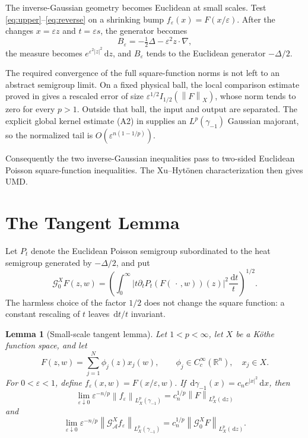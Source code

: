 \documentclass[11pt]{article}
\newtheorem{lemma}{Lemma}
\newcommand{\R}{\mathbb R}
\newcommand{\A}{\mathcal A}
\newcommand{\G}{\mathcal G}
\newcommand{\norm}[1]{\left\lVert #1\right\rVert}
\newcommand{\eps}{\varepsilon}
\newcommand{\dd}{\,\mathrm d}
\begin{document}
The inverse-Gaussian geometry becomes Euclidean at small scales. Test
\eqref{eq:upper}--\eqref{eq:reverse} on a shrinking bump
\(f_\eps(x)=F(x/\eps)\). After the changes \(x=\eps z\) and \(t=\eps s\),
the generator becomes
\[
 B_\eps=-\tfrac12\Delta-\eps^2z\cdot\nabla,
\]
the measure becomes \(e^{\eps^2|z|^2}\dd z\), and \(B_\eps\) tends to the
Euclidean generator \(-\Delta/2\).

The required convergence of the full square-function norms is not left to an
abstract semigroup limit. On a fixed physical ball, the local comparison
estimate proved in \cite{ABFR} gives a rescaled error of size
\(\eps^{1/2}I_{1/2}(\norm{F}_X)\), whose norm tends to zero for every
\(p>1\). Outside that ball, the input and output are separated. The explicit
global kernel estimate (A2) in \cite{ABFR} supplies an
\(L^p(\gamma_{-1})\) Gaussian majorant, so the normalized tail is
\(O(\eps^{n(1-1/p)})\).

Consequently the two inverse-Gaussian inequalities pass to two-sided
Euclidean Poisson square-function inequalities. The Xu--Hyt\"onen
characterization then gives UMD.

\section*{The Tangent Lemma}

Let \(P_t\) denote the Euclidean Poisson semigroup subordinated to the heat
semigroup generated by \(-\Delta/2\), and put
\[
 \G_0^X F(z,w)
 =
 \left(\int_0^\infty
 |t\partial_tP_t(F(\,\cdot\,,w))(z)|^2\frac{\dd t}{t}\right)^{1/2}.
\]
The harmless choice of the factor \(1/2\) does not change the square
function: a constant rescaling of \(t\) leaves \(\dd t/t\) invariant.

\begin{lemma}[Small-scale tangent lemma]\label{lem:tangent}
Let \(1<p<\infty\), let \(X\) be a K\"othe function space, and let
\[
 F(z,w)=\sum_{j=1}^N\phi_j(z)x_j(w),
 \qquad \phi_j\in C_c^\infty(\R^n),\quad x_j\in X.
\]
For \(0<\eps<1\), define \(f_\eps(x,w)=F(x/\eps,w)\). If
\(\dd\gamma_{-1}(x)=c_n e^{|x|^2}\dd x\), then
\[
 \lim_{\eps\downarrow0}
 \eps^{-n/p}\norm{f_\eps}_{L_X^p(\gamma_{-1})}
 =c_n^{1/p}\norm{F}_{L_X^p(\dd z)}
 \tag{1}\label{eq:input-limit}
\]
and
\[
 \lim_{\eps\downarrow0}
 \eps^{-n/p}\norm{\G_\A^Xf_\eps}_{L_X^p(\gamma_{-1})}
 =c_n^{1/p}\norm{\G_0^XF}_{L_X^p(\dd z)}.
 \tag{2}\label{eq:square-limit}
\]
\end{lemma}
\end{document}
